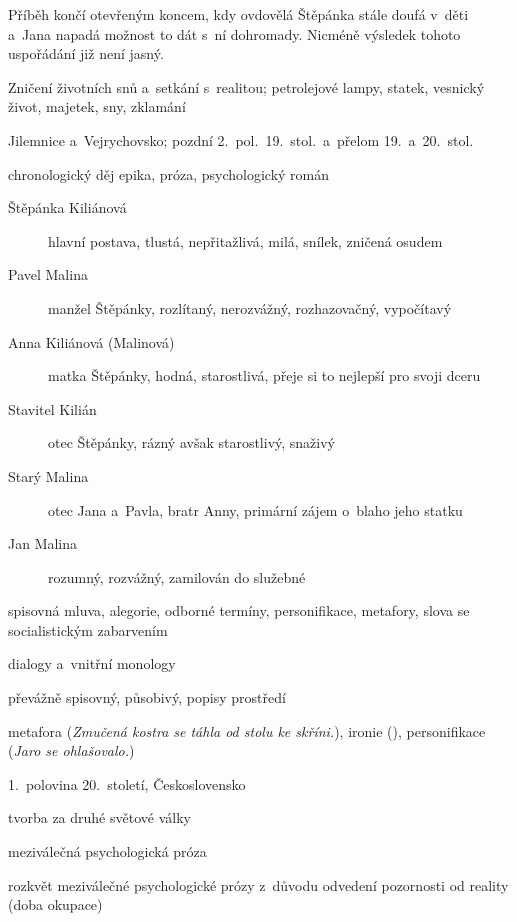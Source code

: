 {Příběh končí otevřeným koncem, kdy ovdovělá Štěpánka stále doufá v~děti a~Jana
napadá možnost to dát s~ní dohromady. Nicméně výsledek tohoto uspořádání již
není jasný.

 Zničení životních snů a~setkání s~realitou; petrolejové
lampy, statek, vesnický život, majetek, sny, zklamání

 Jilemnice a~Vejrychovsko; pozdní 2.~pol.~19.~stol.~a~přelom
19.~a~20.~stol.

 chronologický děj
 epika, próza, psychologický román

\newpart

\begin{description}
	\item[Štěpánka Kiliánová] hlavní postava, tlustá, nepřitažlivá, milá,
		snílek, zničená osudem
	\item[Pavel Malina] manžel Štěpánky, rozlítaný, nerozvážný, rozhazovačný,
		vypočítavý
	\item[Anna Kiliánová (Malinová)] matka Štěpánky, hodná, starostlivá, přeje
		si to nejlepší pro svoji dceru
	\item[Stavitel Kilián] otec Štěpánky, rázný avšak starostlivý, snaživý
	\item[Starý Malina] otec Jana a~Pavla, bratr Anny, primární zájem o~blaho
		jeho statku
	\item[Jan Malina] rozumný, rozvážný, zamilován do služebné
\end{description}

spisovná mluva, alegorie, odborné termíny, personifikace, metafory,
slova se socialistickým zabarvením

 dialogy a~vnitřní monology

\newpart

převážně spisovný, působivý, popisy prostředí

 metafora (\textit{Zmučená kostra se
táhla od stolu ke skříni.}), ironie (\textit{}), personifikace (\textit{Jaro se ohlašovalo.})

\begin{compactitem}
	\item 1.~polovina 20.~století, Československo
	\item tvorba za druhé světové války
	\item meziválečná psychologická próza
	\item rozkvět meziválečné psychologické prózy z~důvodu odvedení pozornosti od reality (doba okupace)
\end{compactitem}

}
